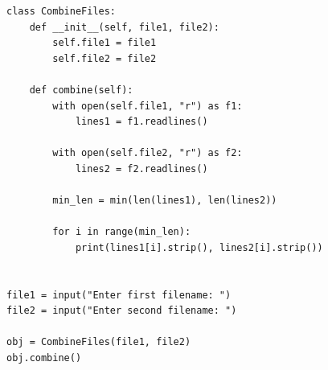 \begin{verbatim}
class CombineFiles:
    def __init__(self, file1, file2):
        self.file1 = file1
        self.file2 = file2

    def combine(self):
        with open(self.file1, "r") as f1:
            lines1 = f1.readlines()

        with open(self.file2, "r") as f2:
            lines2 = f2.readlines()

        min_len = min(len(lines1), len(lines2))

        for i in range(min_len):
            print(lines1[i].strip(), lines2[i].strip())


file1 = input("Enter first filename: ")
file2 = input("Enter second filename: ")

obj = CombineFiles(file1, file2)
obj.combine()
\end{verbatim}